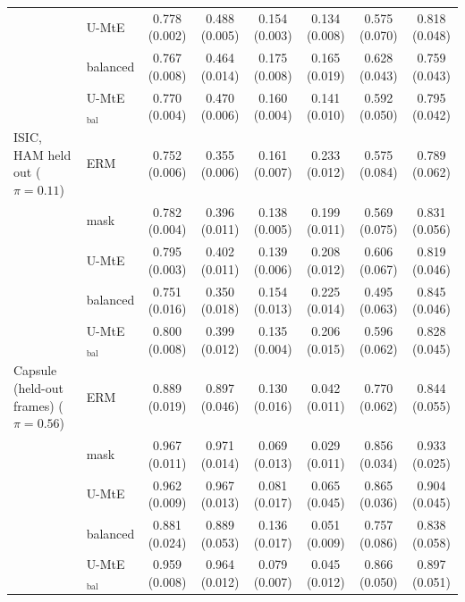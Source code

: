 \begin{table}[t]
{\begin{tabular}{llcccccc}
 & U-MtE & 0.778 (0.002) & 0.488 (0.005) & 0.154 (0.003) & 0.134 (0.008) & 0.575 (0.070) & 0.818 (0.048) \\
 & balanced & 0.767 (0.008) & 0.464 (0.014) & 0.175 (0.008) & 0.165 (0.019) & 0.628 (0.043) & 0.759 (0.043) \\
 & U-MtE$_{\text{bal}}$ & 0.770 (0.004) & 0.470 (0.006) & 0.160 (0.004) & 0.141 (0.010) & 0.592 (0.050) & 0.795 (0.042) \\
\midrule
ISIC, HAM held out ($\pi=0.11$) & ERM & 0.752 (0.006) & 0.355 (0.006) & 0.161 (0.007) & 0.233 (0.012) & 0.575 (0.084) & 0.789 (0.062) \\
 & mask & 0.782 (0.004) & 0.396 (0.011) & 0.138 (0.005) & 0.199 (0.011) & 0.569 (0.075) & 0.831 (0.056) \\
 & U-MtE & 0.795 (0.003) & 0.402 (0.011) & 0.139 (0.006) & 0.208 (0.012) & 0.606 (0.067) & 0.819 (0.046) \\
 & balanced & 0.751 (0.016) & 0.350 (0.018) & 0.154 (0.013) & 0.225 (0.014) & 0.495 (0.063) & 0.845 (0.046) \\
 & U-MtE$_{\text{bal}}$ & 0.800 (0.008) & 0.399 (0.012) & 0.135 (0.004) & 0.206 (0.015) & 0.596 (0.062) & 0.828 (0.045) \\
\midrule
Capsule (held-out frames) ($\pi=0.56$) & ERM & 0.889 (0.019) & 0.897 (0.046) & 0.130 (0.016) & 0.042 (0.011) & 0.770 (0.062) & 0.844 (0.055) \\
 & mask & 0.967 (0.011) & 0.971 (0.014) & 0.069 (0.013) & 0.029 (0.011) & 0.856 (0.034) & 0.933 (0.025) \\
 & U-MtE & 0.962 (0.009) & 0.967 (0.013) & 0.081 (0.017) & 0.065 (0.045) & 0.865 (0.036) & 0.904 (0.045) \\
 & balanced & 0.881 (0.024) & 0.889 (0.053) & 0.136 (0.017) & 0.051 (0.009) & 0.757 (0.086) & 0.838 (0.058) \\
 & U-MtE$_{\text{bal}}$ & 0.959 (0.008) & 0.964 (0.012) & 0.079 (0.007) & 0.045 (0.012) & 0.866 (0.050) & 0.897 (0.051) \\
\bottomrule
\end{tabular}}\end{table}
